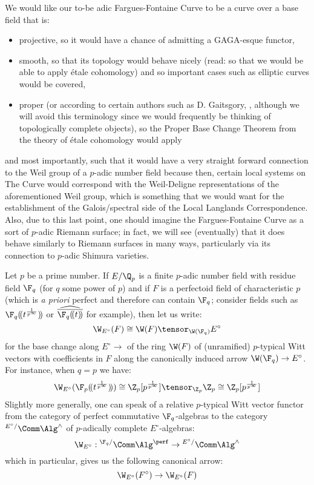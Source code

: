             We would like our to-be adic Fargues-Fontaine Curve to be a curve over a base field that is:
                \begin{itemize}
                    \item projective, so it would have a chance of admitting a GAGA-esque functor,
                    \item smooth, so that its topology would behave nicely (read: so that we would be able to apply \'etale cohomology) and so important cases such as elliptic curves would be covered, 
                    \item proper (or according to certain authors such as D. Gaitsgory, , although we will avoid this terminology since we would frequently be thinking of topologically complete objects), so the Proper Base Change Theorem from the theory of \'etale cohomology would apply 
                \end{itemize}
            and most importantly, such that it would have a very straight forward connection to the Weil group of a $p$-adic number field because then, certain local systems on The Curve would correspond with the Weil-Deligne representations of the aforementioned Weil group, which is something that we would want for the establishment of the Galois/spectral side of the Local Langlands Correspondence. Also, due to this last point, one should imagine the Fargues-Fontaine Curve as a sort of $p$-adic Riemann surface; in fact, we will see (eventually) that it does behave similarly to Riemann surfaces in many ways, particularly via its connection to $p$-adic Shimura varieties.
            
            \begin{convention} \label{conv: relative_witt_vectors}
                Let $p$ be a prime number. If $E/\Q_p$ is a finite $p$-adic number field with residue field $\F_q$ (for $q$ some power of $p$) and if $F$ is a perfectoid field of characteristic $p$ (which is \textit{a priori} perfect and therefore can contain $\F_q$; consider fields such as $\F_q(\!(t^{\frac{1}{p^{\infty}}})\!)$ or $\widehat{\overline{\F_q(\!(t)\!)}}$ for example), then let us write:
                    $$\W_{E^{\circ}}(F) \cong \W(F) \tensor_{\W(\F_q)} E^{\circ}$$
                for the base change along $E^{\circ} \to $ of the ring $\W(F)$ of (unramified) $p$-typical Witt vectors with coefficients in $F$ along the canonically induced arrow $\W(\F_q) \to E^{\circ}$. For instance, when $q = p$ we have:
                    $$\W_{E^{\circ}}(\F_p(\!(t^{\frac{1}{p^{\infty}}})\!)) \cong \Z_p[p^{\frac{1}{p^{\infty}}}] \tensor_{\Z_p} \Z_p \cong \Z_p[p^{\frac{1}{p^{\infty}}}]$$
                Slightly more generally, one can speak of a relative $p$-typical Witt vector functor from the category of perfect commutative $\F_q$-algebras to the category ${}^{E^{\circ}/}\Comm\Alg^{\wedge}$ of $p$-adically complete $E^{\circ}$-algebras:
                    $$\W_{E^{\circ}}: {}^{\F_q/}\Comm\Alg^{\perf} \to {}^{E^{\circ}/}\Comm\Alg^{\wedge}$$
                which in particular, gives us the following canonical arrow:
                    $$\W_{E^{\circ}}(F^{\circ}) \to \W_{E^{\circ}}(F)$$
            \end{convention}
            
